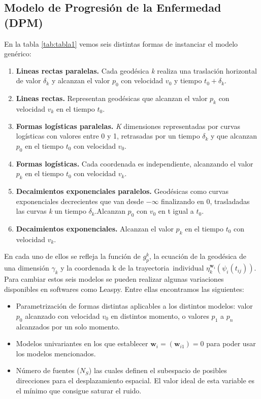 	\subsection{Modelo de Progresión de la Enfermedad (DPM)}
	En la tabla \ref{tab:tabla1} vemos seis distintas formas de instanciar el modelo genérico: 
	\begin{enumerate}
		\item \textbf{Lineas rectas paralelas.} Cada geodésica \textit{k} realiza una traslación horizontal de valor $\delta_{k}$ y alcanzan el valor $p_{0}$ con velocidad $v_{0}$ y tiempo $t_{0}+\delta_{k}$.
		\item\textbf{ Lineas rectas.} Representan geodésicas que alcanzan el valor $p_{k}$ con velocidad $v_{k}$ en el tiempo $t_{0}$.
		\item \textbf{Formas logísticas paralelas.} \textit{K} dimensiones representadas por curvas logísticas con valores entre 0 y 1, retrasadas por un tiempo $\delta_{k}$ y que alcanzan $p_{0}$ en el tiempo $t_{0}$ con velocidad $v_{0}$.
		\item \textbf{Formas logísticas.} Cada coordenada es independiente, alcanzando el valor $p_{k}$ en el tiempo $t_{0}$ con velocidad $v_{k}$.
		\item \textbf{Decaimientos exponenciales paralelos.} Geodésicas como curvas exponenciales decrecientes que van desde $-\infty$ finalizando en 0, trasladadas las curvas \textit{k} un tiempo $\delta_{k}$.Alcanzan $p_{0}$ con $v_{0}$ en t igual a $t_{0}$.
		\item \textbf{Decaimientos exponenciales.} Alcanzan el valor $p_{k}$ en el tiempo $t_{0}$ con velocidad $v_{k}$.
	\end{enumerate}
	
	En cada uno de ellos se refleja la función de $g_{p}^{k}$, la ecuación de la geodésica de una dimensión $\gamma_{k}$  y la coordenada k de la trayectoria individual $\eta_{k}^{\textbf{w}_{i}}(\psi_{i}(t_{ij}))$. \\
	
	Para cambiar estos seis modelos se pueden realizar algunas variaciones disponibles en softwares como Leaspy. Entre ellas encontramos las siguientes:
	\begin{itemize}
		\item Parametrización de formas distintas aplicables a los distintos modelos: valor $p_{0}$ alcanzado con velocidad $v_{0}$ en distintos momento, o valores $p_{1}$ a $p_{n}$ alcanzados por un solo momento.
		\item Modelos univariantes en los que establecer $\textbf{w}_{i}=(\textbf{w}_{i1})=0$ para poder usar los modelos mencionados.
		\item Número de fuentes ($\textit{N}_{S}$) las cuales definen el subespacio de posibles direcciones para el desplazamiento espacial. El valor ideal de esta variable es el mínimo que consigue saturar el ruido.
	\end{itemize}
	
